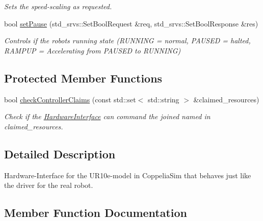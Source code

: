 \begin{DoxyCompactItemize}
\begin{DoxyCompactList}\small\item\em Sets the speed-\/scaling as requested. \end{DoxyCompactList}\item 
bool \hyperlink{classcoppeliasim__interface_1_1HardwareInterface_a00cc87162beaecdf82c1510ae84b2d95}{set\+Pause} (std\+\_\+srvs\+::\+Set\+Bool\+Request \&req, std\+\_\+srvs\+::\+Set\+Bool\+Response \&res)
\begin{DoxyCompactList}\small\item\em Controls if the robots running state (R\+U\+N\+N\+I\+NG = normal, P\+A\+U\+S\+ED = halted, R\+A\+M\+P\+UP = Accelerating from P\+A\+U\+S\+ED to R\+U\+N\+N\+I\+NG) \end{DoxyCompactList}\end{DoxyCompactItemize}
\subsection*{Protected Member Functions}
\begin{DoxyCompactItemize}
\item 
bool \hyperlink{classcoppeliasim__interface_1_1HardwareInterface_af95c41749882b5d60ba02695c6b51407}{check\+Controller\+Claims} (const std\+::set$<$ std\+::string $>$ \&claimed\+\_\+resources)
\begin{DoxyCompactList}\small\item\em Check if the \hyperlink{classcoppeliasim__interface_1_1HardwareInterface}{Hardware\+Interface} can command the joined named in claimed\+\_\+resources. \end{DoxyCompactList}\end{DoxyCompactItemize}


\subsection{Detailed Description}
Hardware-\/\+Interface for the U\+R10e-\/model in Coppelia\+Sim that behaves just like the driver for the real robot. 

\subsection{Member Function Documentation}
\mbox{\label{classcoppeliasim__interface_1_1HardwareInterface_af95c41749882b5d60ba02695c6b51407}} 
